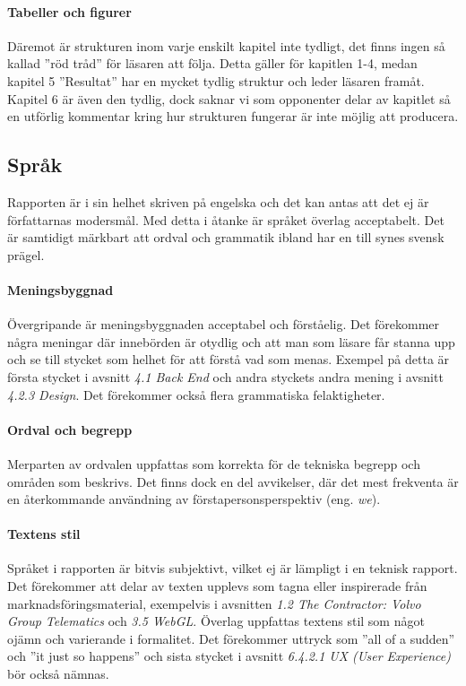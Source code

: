     \paragraph{Tabeller och figurer}

    
        Däremot är strukturen inom varje enskilt kapitel inte tydligt, det finns ingen så kallad ''röd tråd'' för läsaren att följa. Detta gäller för kapitlen 1-4, medan kapitel 5 ''Resultat'' har en mycket tydlig struktur och leder läsaren framåt. Kapitel 6 är även den tydlig, dock saknar vi som opponenter delar av kapitlet så en utförlig kommentar kring hur strukturen fungerar är inte möjlig att producera.


    \subsection{Språk} %
    \label{sub:sprak}
    Rapporten är i sin helhet skriven på engelska och det kan antas att det ej är författarnas modersmål. Med detta i åtanke är språket överlag acceptabelt. Det är samtidigt märkbart att ordval och grammatik ibland har en till synes svensk prägel.

    \paragraph{Meningsbyggnad}
        Övergripande är meningsbyggnaden acceptabel och förståelig. Det förekommer några meningar där innebörden är otydlig och att man som läsare får stanna upp och se till stycket som helhet för att förstå vad som menas. Exempel på detta är första stycket i avsnitt \emph{4.1 Back End} och andra styckets andra mening i avsnitt \emph{4.2.3 Design}. Det förekommer också flera grammatiska felaktigheter.

    \paragraph{Ordval och begrepp}
        Merparten av ordvalen uppfattas som korrekta för de tekniska begrepp och områden som beskrivs. Det finns dock en del avvikelser, där det mest frekventa är en återkommande användning av förstapersonsperspektiv (eng. \emph{we}). 

    \paragraph{Textens stil}
        Språket i rapporten är bitvis subjektivt, vilket ej är lämpligt i en teknisk rapport. Det förekommer att delar av texten upplevs som tagna eller inspirerade från marknadsföringsmaterial, exempelvis i avsnitten \emph{1.2 The Contractor: Volvo Group Telematics} och \emph{3.5 WebGL}. Överlag uppfattas textens stil som något ojämn och varierande i formalitet. Det förekommer uttryck som ''all of a sudden'' och ''it just so happens'' och sista stycket i avsnitt \emph{6.4.2.1 UX (User Experience)} bör också nämnas.


